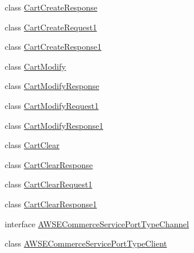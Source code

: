 \begin{DoxyCompactItemize}
class \hyperlink{class_price___comparison_1_1amazon_1_1ecs_1_1_cart_create_response}{Cart\-Create\-Response}
\begin{DoxyCompactList}\small\item\em \end{DoxyCompactList}\item 
class \hyperlink{class_price___comparison_1_1amazon_1_1ecs_1_1_cart_create_request1}{Cart\-Create\-Request1}
\item 
class \hyperlink{class_price___comparison_1_1amazon_1_1ecs_1_1_cart_create_response1}{Cart\-Create\-Response1}
\item 
class \hyperlink{class_price___comparison_1_1amazon_1_1ecs_1_1_cart_modify}{Cart\-Modify}
\begin{DoxyCompactList}\small\item\em \end{DoxyCompactList}\item 
class \hyperlink{class_price___comparison_1_1amazon_1_1ecs_1_1_cart_modify_response}{Cart\-Modify\-Response}
\begin{DoxyCompactList}\small\item\em \end{DoxyCompactList}\item 
class \hyperlink{class_price___comparison_1_1amazon_1_1ecs_1_1_cart_modify_request1}{Cart\-Modify\-Request1}
\item 
class \hyperlink{class_price___comparison_1_1amazon_1_1ecs_1_1_cart_modify_response1}{Cart\-Modify\-Response1}
\item 
class \hyperlink{class_price___comparison_1_1amazon_1_1ecs_1_1_cart_clear}{Cart\-Clear}
\begin{DoxyCompactList}\small\item\em \end{DoxyCompactList}\item 
class \hyperlink{class_price___comparison_1_1amazon_1_1ecs_1_1_cart_clear_response}{Cart\-Clear\-Response}
\begin{DoxyCompactList}\small\item\em \end{DoxyCompactList}\item 
class \hyperlink{class_price___comparison_1_1amazon_1_1ecs_1_1_cart_clear_request1}{Cart\-Clear\-Request1}
\item 
class \hyperlink{class_price___comparison_1_1amazon_1_1ecs_1_1_cart_clear_response1}{Cart\-Clear\-Response1}
\item 
interface \hyperlink{interface_price___comparison_1_1amazon_1_1ecs_1_1_a_w_s_e_commerce_service_port_type_channel}{A\-W\-S\-E\-Commerce\-Service\-Port\-Type\-Channel}
\item 
class \hyperlink{class_price___comparison_1_1amazon_1_1ecs_1_1_a_w_s_e_commerce_service_port_type_client}{A\-W\-S\-E\-Commerce\-Service\-Port\-Type\-Client}
\end{DoxyCompactItemize}
